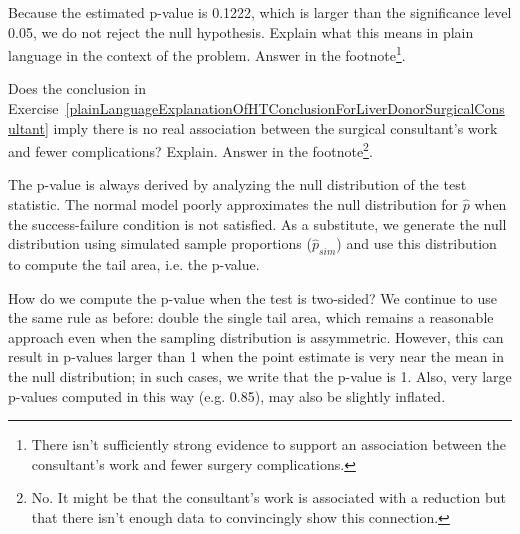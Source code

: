 \begin{exercise} \label{plainLanguageExplanationOfHTConclusionForLiverDonorSurgicalConsultant}
Because the estimated p-value is 0.1222, which is larger than the significance level 0.05, we do not reject the null hypothesis. Explain what this means in plain language in the context of the problem. Answer in the footnote\footnote{There isn't sufficiently strong evidence to support an association between the consultant's work and fewer surgery complications.}.
\end{exercise}

\begin{exercise}
Does the conclusion in Exercise~\ref{plainLanguageExplanationOfHTConclusionForLiverDonorSurgicalConsultant} imply there is no real association between the surgical consultant's work and fewer complications? Explain. Answer in the footnote\footnote{No. It might be that the consultant's work is associated with a reduction but that there isn't enough data to convincingly show this connection.}.
\end{exercise}

\begin{termBox}{
The p-value is always derived by analyzing the null distribution of the test statistic. The normal model poorly approximates the null distribution for $\hat{p}$ when the success-failure condition is not satisfied. As a substitute, we generate the null distribution using simulated sample proportions ($\hat{p}_{sim}$) and use this distribution to compute the tail area, i.e. the p-value.}
\end{termBox}

How do we compute the p-value when the test is two-sided? We continue to use the same rule as before: double the single tail area, which remains a reasonable approach even when the sampling distribution is assymmetric. However, this can result in p-values larger than 1 when the point estimate is very near the mean in the null distribution; in such cases, we write that the p-value is 1. Also, very large p-values computed in this way (e.g. 0.85), may also be slightly inflated.


